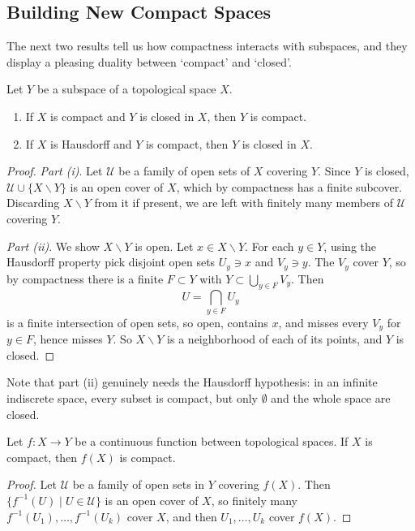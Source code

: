 \subsection{Building New Compact Spaces}

The next two results tell us how compactness interacts with subspaces, and they display a pleasing duality between `compact' and `closed'.

\begin{theorem}\label{thm:compactclosed}
    Let $Y$ be a subspace of a topological space $X$.
    \begin{enumerate}[label=(\roman*)]
        \item If $X$ is compact and $Y$ is closed in $X$, then $Y$ is compact.
        \item If $X$ is Hausdorff and $Y$ is compact, then $Y$ is closed in $X$.
    \end{enumerate}
\end{theorem}
\begin{proof}
    \emph{Part (i)}. Let $\mathcal{U}$ be a family of open sets of $X$ covering $Y$. Since $Y$ is closed, $\mathcal{U} \cup \{X \backslash Y\}$ is an open cover of $X$, which by compactness has a finite subcover. Discarding $X \backslash Y$ from it if present, we are left with finitely many members of $\mathcal{U}$ covering $Y$.

    \emph{Part (ii)}. We show $X \backslash Y$ is open. Let $x \in X \backslash Y$. For each $y \in Y$, using the Hausdorff property pick disjoint open sets $U_y \ni x$ and $V_y \ni y$. The $V_y$ cover $Y$, so by compactness there is a finite $F \subset Y$ with $Y \subset \bigcup_{y \in F} V_y$. Then
    $$
    U = \bigcap_{y \in F} U_y
    $$
    is a finite intersection of open sets, so open, contains $x$, and misses every $V_y$ for $y \in F$, hence misses $Y$. So $X \backslash Y$ is a neighborhood of each of its points, and $Y$ is closed.
\end{proof}

Note that part (ii) genuinely needs the Hausdorff hypothesis: in an infinite indiscrete space, every subset is compact, but only $\emptyset$ and the whole space are closed.

\begin{theorem}\label{thm:ctsimage}
    Let $f: X \rightarrow Y$ be a continuous function between topological spaces. If $X$ is compact, then $f(X)$ is compact.
\end{theorem}
\begin{proof}
    Let $\mathcal{U}$ be a family of open sets in $Y$ covering $f(X)$. Then $\{f^{-1}(U) \mid U \in \mathcal{U}\}$ is an open cover of $X$, so finitely many $f^{-1}(U_1), \dots, f^{-1}(U_k)$ cover $X$, and then $U_1, \dots, U_k$ cover $f(X)$.
\end{proof}

